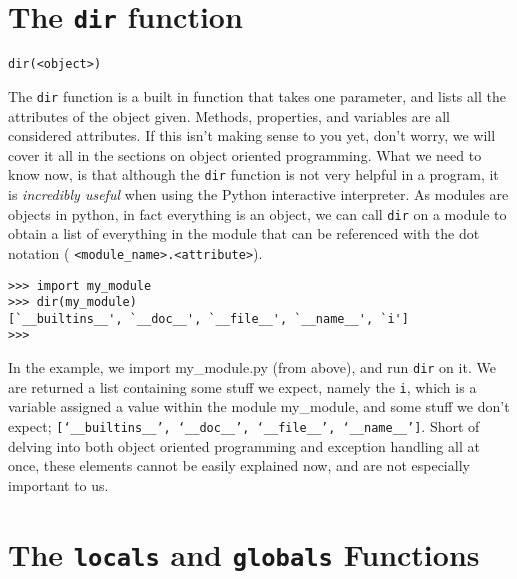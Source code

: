 \section{The \texttt{dir} function}
\begin{lstlisting}
dir(<object>)
\end{lstlisting}

The \texttt{dir} function is a built in function that takes one parameter,   and lists all the attributes of the object given. Methods, properties,   and variables are all considered attributes. If this isn't making sense   to you yet, don't worry, we will cover it all in the sections on object   oriented programming. What we need to know now, is that although the   \texttt{dir} function is not very helpful in a program, it is \textit{incredibly   useful} when using the Python interactive interpreter. As   modules are objects in python, in fact everything is an object, we can   call \texttt{dir} on a module to obtain a list of everything in the module that   can be referenced with the dot notation   (
\texttt{<module\_name>.<attribute>}).
\begin{lstlisting}
>>> import my_module
>>> dir(my_module)
[`__builtins__', `__doc__', `__file__', `__name__', `i']
>>>
\end{lstlisting}

In the example, we import my\_module.py (from above), and run \texttt{dir}   on it. We are returned a list containing some stuff we expect, namely   the \texttt{i}, which is a variable assigned a value within the module   my\_module, and some stuff we don't expect; 
\texttt{[`\_\_builtins\_\_',   `\_\_doc\_\_', `\_\_file\_\_', `\_\_name\_\_']}. Short of delving into both   object oriented programming and exception handling all at once, these   elements cannot be easily explained now, and are not especially   important to us.

\section{The \texttt{locals} and \texttt{globals} Functions}


